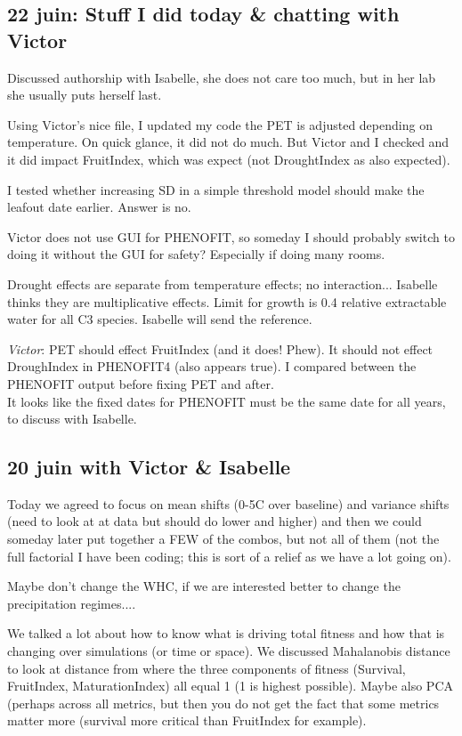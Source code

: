 \documentclass[11pt,letter]{article}
\begin{document}
\subsection{22 juin: Stuff I did today \& chatting with Victor}

Discussed authorship with Isabelle, she does not care too much, but in her lab she usually puts herself last. 

Using Victor's nice file, I updated my code the PET is adjusted depending on temperature. On quick glance, it did not do much. But Victor and I checked and it did impact FruitIndex, which was expect (not DroughtIndex as also expected). 

I tested whether increasing SD in a simple threshold model should make the leafout date earlier. Answer is no. 

Victor does not use GUI for PHENOFIT, so someday I should probably switch to doing it without the GUI for safety? Especially if doing many rooms. 

Drought effects are separate from temperature effects; no interaction... Isabelle thinks they are multiplicative effects. Limit for growth is 0.4 relative extractable water for all C3 species. Isabelle will send the reference. 

\emph{Victor}:
PET should effect FruitIndex (and it does! Phew). It should not effect DroughIndex in PHENOFIT4 (also appears true). I compared between the PHENOFIT output before fixing PET and after. \\
It looks like the fixed dates for PHENOFIT must be the same date for all years, to discuss with Isabelle.\\

\subsection{20 juin with Victor \& Isabelle}

Today we agreed to focus on mean shifts (0-5C over baseline) and variance shifts (need to look at at data but should do lower and higher) and then we could someday later put together a FEW of the combos, but not all of them (not the full factorial I have been coding; this is sort of a relief as we have a lot going on). 

Maybe don't change the WHC, if we are interested better to change the precipitation regimes.... 

We talked a lot about how to know what is driving total fitness and how that is changing over simulations (or time or space). We discussed Mahalanobis distance to look at distance from where the three components of fitness (Survival, FruitIndex, MaturationIndex) all equal 1 (1 is highest possible). Maybe also PCA (perhaps across all metrics, but then you do not get the fact that some metrics matter more (survival more critical than FruitIndex for example). 
\end{document}
